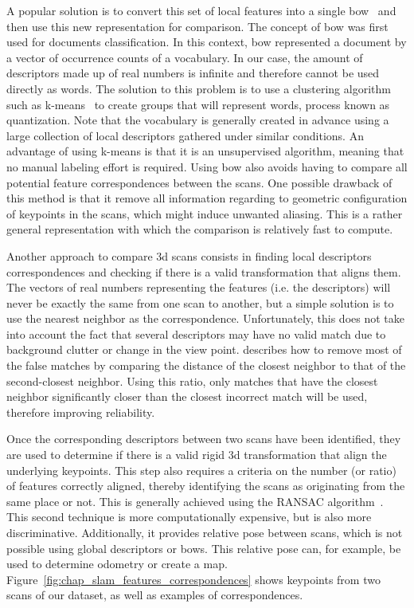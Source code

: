 A popular solution is to convert this set of local features into a single \gls*{bow}~\citep{salton1983mcgill} and then use this new representation for comparison. The concept of \gls*{bow} was first used for documents classification. In this context, \gls*{bow} represented a document by a vector of occurrence counts of a vocabulary. In our case, the amount of descriptors made up of real numbers is infinite and therefore cannot be used directly as words. The solution to this problem is to use a clustering algorithm such as k-means~\citep{MacQueen1967} to create groups that will represent words, process known as quantization. Note that the vocabulary is generally created in advance using a large collection of local descriptors gathered under similar conditions. An advantage of using k-means is that it is an unsupervised algorithm, meaning that no manual labeling effort is required. Using \gls*{bow} also avoids having to compare all potential feature correspondences between the scans. One possible drawback of this method is that it remove all information regarding to geometric configuration of keypoints in the scans, which might induce unwanted aliasing. This is a rather general representation with which the comparison is relatively fast to compute.

Another approach to compare \gls*{3d} scans consists in finding local descriptors correspondences and checking if there is a valid transformation that aligns them. The vectors of real numbers representing the features (i.e. the descriptors) will never be exactly the same from one scan to another, but a simple solution is to use the nearest neighbor as the correspondence. Unfortunately, this does not take into account the fact that several descriptors may have no valid match due to background clutter or change in the view point. \cite[Section 7.1]{Lowe2004} describes how to remove most of the false matches by comparing the distance of the closest neighbor to that of the second-closest neighbor. Using this ratio, only matches that have the closest neighbor significantly closer than the closest incorrect match will be used, therefore improving reliability.

Once the corresponding descriptors between two scans have been identified, they are used to determine if there is a valid rigid \gls*{3d} transformation that align the underlying keypoints. This step also requires a criteria on the number (or ratio) of features correctly aligned, thereby identifying the scans as originating from the same place or not. This is generally achieved using the RANSAC algorithm~\cite{Fischler1981}. This second technique is more computationally expensive, but is also more discriminative. Additionally, it provides relative pose between scans, which is not possible using global descriptors or \gls*{bow}s. This relative pose can, for example, be used to determine odometry or create a map. Figure~\ref{fig:chap_slam_features_correspondences} shows keypoints from two scans of our dataset, as well as examples of correspondences.

